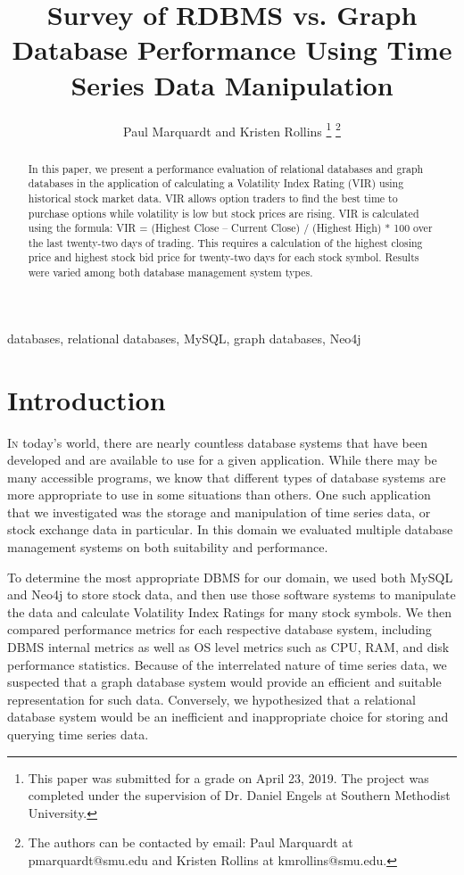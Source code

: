 \documentclass{IEEEtran}
\begin{document}
	
\title{Survey of RDBMS vs. Graph Database Performance Using Time Series Data Manipulation}
\author{Paul Marquardt and Kristen Rollins 
\thanks{This paper was submitted for a grade on April 23, 2019. The project was completed under the supervision of Dr. Daniel Engels at Southern Methodist University.} 
\thanks{The authors can be contacted by email: Paul Marquardt at pmarquardt@smu.edu and Kristen Rollins at kmrollins@smu.edu.}}

\maketitle

\begin{abstract}
In this paper, we present a performance evaluation of relational databases and graph databases in the application of calculating a Volatility Index Rating (VIR) using historical stock market data. VIR allows option traders to find the best time to purchase options while volatility is low but stock prices are rising.  VIR is calculated using the formula: VIR = (Highest Close – Current Close) / (Highest High) * 100 over the last twenty-two days of trading.  This requires a calculation of the highest closing price and highest stock bid price for twenty-two days for each stock symbol. Results were varied among both database management system types. 

\end{abstract}

\begin{IEEEkeywords}
	databases, relational databases, MySQL, graph databases, Neo4j
\end{IEEEkeywords}


\section{Introduction}

\lettrine{I}{n} today’s world, there are nearly countless database systems that have been developed and are available to use for a given application. While there may be many accessible programs, we know that different types of database systems are more appropriate to use in some situations than others. One such application that we investigated was the storage and manipulation of time series data, or stock exchange data in particular. In this domain we evaluated multiple database management systems on both suitability and performance. 

To determine the most appropriate DBMS for our domain, we used both MySQL and Neo4j to store stock data, and then use those software systems to manipulate the data and calculate Volatility Index Ratings for many stock symbols. We then compared performance metrics for each respective database system, including DBMS internal metrics as well as OS level metrics such as CPU, RAM, and disk performance statistics. Because of the interrelated nature of time series data, we suspected that a graph database system would provide an efficient and suitable representation for such data. Conversely, we hypothesized that a relational database system would be an inefficient and inappropriate choice for storing and querying time series data. 
\end{document}
